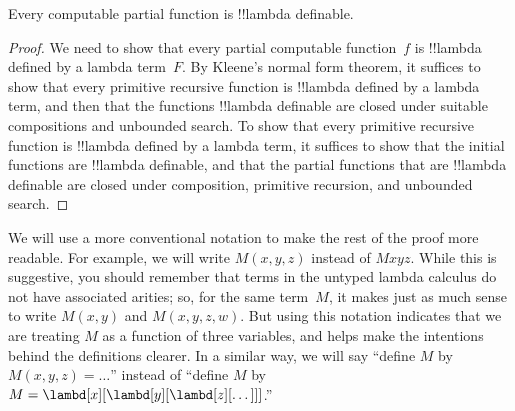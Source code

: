 \documentclass[../../../include/open-logic-section]{subfiles}
\begin{document}

\begin{thm}
Every computable partial function is !!{lambda definable}.
\end{thm}

\begin{proof}
We need to show that every partial computable function~$f$ is
!!{lambda defined} by a lambda term~$F$. By Kleene's normal form
theorem, it suffices to show that every primitive recursive function
is !!{lambda defined} by a lambda term, and then that the functions
!!{lambda definable} are closed under suitable compositions and
unbounded search. To show that every primitive recursive function is
!!{lambda defined} by a lambda term, it suffices to show that the
initial functions are !!{lambda definable}, and that the partial
functions that are !!{lambda definable} are closed under
composition, primitive recursion, and unbounded search.
\end{proof}

We will use a more conventional notation to make the rest of the proof
more readable. For example, we will write $M(x, y, z)$ instead of
$Mxyz$. While this is suggestive, you should remember that terms in
the untyped lambda calculus do not have associated arities; so, for
the same term~$M$, it makes just as much sense to write $M(x,y)$ and
$M(x,y,z,w)$. But using this notation indicates that we are treating
$M$ as a function of three variables, and helps make the intentions
behind the definitions clearer. In a similar way, we will say ``define
$M$ by $M(x,y,z) = \dots$'' instead of ``define $M$ by $M =
\lambd[x][\lambd[y][\lambd[z][\dots]]]$.''
\end{document}
